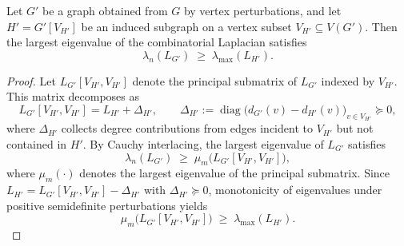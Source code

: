 \documentclass[10pt,a4paper]{amsart}
\begin{document}
\begin{theorem}\label{thm:induced-lower-bound}
Let $G'$ be a graph obtained from $G$ by vertex perturbations, and let $H' = G'[V_{H'}]$ be an induced subgraph on a vertex subset $V_{H'} \subseteq V(G')$.
Then the largest eigenvalue of the combinatorial Laplacian satisfies
$$
\lambda_n(L_{G'}) \;\ge\; \lambda_{\max}(L_{H'}).
$$
\end{theorem}

\begin{proof}
Let $L_{G'}[V_{H'},V_{H'}]$ denote the principal submatrix of $L_{G'}$ indexed by $V_{H'}$.
This matrix decomposes as
$$
L_{G'}[V_{H'},V_{H'}] = L_{H'} + \Delta_{H'},
\qquad
\Delta_{H'} := \operatorname{diag}\bigl(d_{G'}(v)-d_{H'}(v)\bigr)_{v\in V_{H'}} \succeq 0,
$$
where $\Delta_{H'}$ collects degree contributions from edges incident to $V_{H'}$ but not contained in $H'$.
By Cauchy interlacing, the largest eigenvalue of $L_{G'}$ satisfies
$$
\lambda_n(L_{G'}) \;\ge\; \mu_m\!\bigl(L_{G'}[V_{H'},V_{H'}]\bigr),
$$
where $\mu_m(\cdot)$ denotes the largest eigenvalue of the principal submatrix.
Since $L_{H'} = L_{G'}[V_{H'},V_{H'}] - \Delta_{H'}$ with $\Delta_{H'} \succeq 0$, monotonicity of eigenvalues under positive semidefinite perturbations yields
$$
\mu_m\!\bigl(L_{G'}[V_{H'},V_{H'}]\bigr) \;\ge\; \lambda_{\max}(L_{H'}).
$$
\end{proof}
\end{document}
